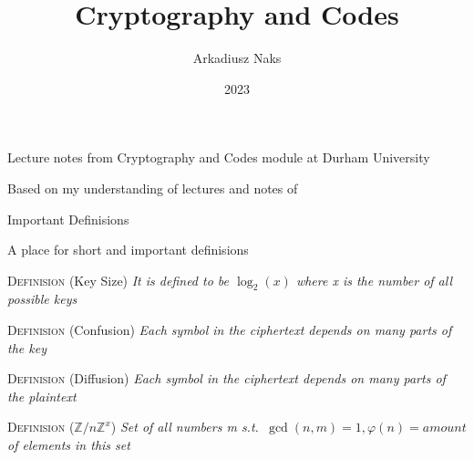 \documentclass[12pt, letterpaper]{article}
\title{Cryptography and Codes}
\author{Arkadiusz Naks}
\date{2023}
\begin{document}
\begin{titlepage}
  \begin{center}
    \makeatletter
    \vspace*{1cm}
    \Huge
    \textbf{\@title}

    \vspace{0.5cm}
    \Large
    Lecture notes from Cryptography and Codes module at Durham University

    \vspace{1.5cm}

    \textbf{\@author}

    \vfill

    \vspace{0.8cm}

    \small
    Based on my understanding of lectures and notes of \\
    \@date{}
  \end{center}
\end{titlepage}

\tableofcontents

\newpage

\begin{section}{Important Definisions}

  A place for short and important definisions

  \textsc{Definision} (Key Size) \textit{It is defined to be \(\log_{2}(x)\)
    where x is the number of all possible keys}

  \textsc{Definision} (Confusion) \textit{Each symbol in the ciphertext depends
    on many parts of the key}

  \textsc{Definision} (Diffusion) \textit{Each symbol in the ciphertext depends
    on many parts of the plaintext}

  \textsc{Definision} (\(\mathbb{Z}/n \mathbb{Z}^{x}\)) \textit{Set of all
    numbers m s.t.\ \(\gcd(n, m) = 1, \varphi(n) = amount\) of elements in this
    set}

\end{section}
\end{document}
